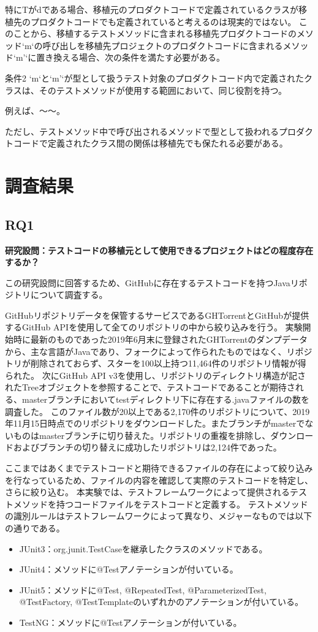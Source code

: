\documentclass[conference]{IEEEtran}
\begin{document}
特にTがdである場合、移植元のプロダクトコードで定義されているクラスが移植先のプロダクトコードでも定義されていると考えるのは現実的ではない。
このことから、移植するテストメソッドに含まれる移植先プロダクトコードのメソッド`m`の呼び出しを移植先プロジェクトのプロダクトコードに含まれるメソッド`m'`に置き換える場合、次の条件を満たす必要がある。

条件2 `m`と`m'`が型として扱うテスト対象のプロダクトコード内で定義されたクラスは、そのテストメソッドが使用する範囲において、同じ役割を持つ。

例えば、〜〜。

ただし、テストメソッド中で呼び出されるメソッドで型として扱われるプロダクトコードで定義されたクラス間の関係は移植先でも保たれる必要がある。

\section{調査結果}

\subsection{RQ1}
\textbf{研究設問：テストコードの移植元として使用できるプロジェクトはどの程度存在するか？}

この研究設問に回答するため、GitHub\cite{GitHub}に存在するテストコードを持つJavaリポジトリについて調査する。

GitHubリポジトリデータを保管するサービスであるGHTorrent\cite{Gousios2013}とGitHubが提供するGitHub API\cite{GitHubAPIv3}を使用して全てのリポジトリの中から絞り込みを行う。
実験開始時に最新のものであった2019年6月末に登録されたGHTorrentのダンプデータから、主な言語がJavaであり、フォークによって作られたものではなく、リポジトリが削除されておらず、スターを100以上持つ11,464件のリポジトリ情報が得られた。
次にGitHub API v3を使用し、リポジトリのディレクトリ構造が記されたTreeオブジェクトを参照することで、テストコードであることが期待される、masterブランチにおいてtestディレクトリ下に存在する.javaファイルの数を調査した。
このファイル数が20以上である2,170件のリポジトリについて、2019年11月15日時点でのリポジトリをダウンロードした。またブランチがmasterでないものはmasterブランチに切り替えた。リポジトリの重複を排除し、ダウンロードおよびブランチの切り替えに成功したリポジトリは2,124件であった。

ここまではあくまでテストコードと期待できるファイルの存在によって絞り込みを行なっているため、ファイルの内容を確認して実際のテストコードを特定し、さらに絞り込む。
本実験では、テストフレームワークによって提供されるテストメソッドを持つコードファイルをテストコードと定義する。
テストメソッドの識別ルールはテストフレームワークによって異なり、メジャーなものでは以下の通りである。
\begin{itemize}
\item JUnit3：org.junit.TestCaseを継承したクラスのメソッドである。
\item JUnit4：メソッドに@Testアノテーションが付いている。
\item JUnit5：メソッドに@Test, @RepeatedTest, @ParameterizedTest, @TestFactory, @TestTemplateのいずれかのアノテーションが付いている。
\item TestNG：メソッドに@Testアノテーションが付いている。
\end{itemize}
\end{document}
